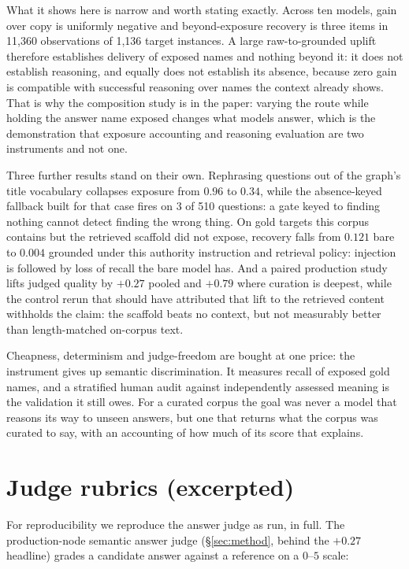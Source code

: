 \documentclass[10pt,twocolumn]{article}
\begin{document}
What it shows here is narrow and worth stating exactly. Across ten models, gain over copy is uniformly negative and beyond-exposure recovery is three items in 11{,}360 observations of 1{,}136 target instances. A large raw-to-grounded uplift therefore establishes delivery of exposed names and nothing beyond it: it does not establish reasoning, and equally does not establish its absence, because zero gain is compatible with successful reasoning over names the context already shows. That is why the composition study is in the paper: varying the route while holding the answer name exposed changes what models answer, which is the demonstration that exposure accounting and reasoning evaluation are two instruments and not one.

Three further results stand on their own. Rephrasing questions out of the graph's title vocabulary collapses exposure from $0.96$ to $0.34$, while the absence-keyed fallback built for that case fires on 3 of 510 questions: a gate keyed to finding nothing cannot detect finding the wrong thing. On gold targets this corpus contains but the retrieved scaffold did not expose, recovery falls from $0.121$ bare to $0.004$ grounded under this authority instruction and retrieval policy: injection is followed by loss of recall the bare model has. And a paired production study lifts judged quality by $+0.27$ pooled and $+0.79$ where curation is deepest, while the control rerun that should have attributed that lift to the retrieved content withholds the claim: the scaffold beats no context, but not measurably better than length-matched on-corpus text.

Cheapness, determinism and judge-freedom are bought at one price: the instrument gives up semantic discrimination. It measures recall of exposed gold names, and a stratified human audit against independently assessed meaning is the validation it still owes. For a curated corpus the goal was never a model that reasons its way to unseen answers, but one that returns what the corpus was curated to say, with an accounting of how much of its score that explains.

\appendix
\onecolumn
\section{Judge rubrics (excerpted)}\label{sec:appendix-rubrics}
For reproducibility we reproduce the answer judge as run, in full. The
production-node semantic answer judge (\S\ref{sec:method}, behind the $+0.27$
headline) grades a candidate answer against a reference on a $0$--$5$ scale:
\end{document}
